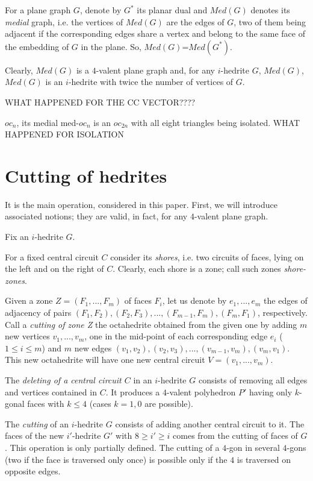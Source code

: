 \documentclass[12pt]{article}
\begin{document}
For a plane graph $G$, denote by $G^*$ its planar dual and {\em $Med(G)$} 
denotes its {\em medial} graph, i.e. the vertices of $Med(G)$ are the edges of 
$G$, two of them being adjacent if the corresponding edges share a vertex and 
belong to the same face of the embedding of $G$ in the plane. 
So, $Med(G)$=$Med(G^*)$.

Clearly, $Med(G)$ is a $4$-valent plane graph and, for any $i$-hedrite $G$, $Med(G)$, $Med(G)$ is an $i$-hedrite with twice the number of vertices of $G$.

WHAT HAPPENED FOR THE CC VECTOR????

$oc_n$, its medial
med-$oc_{n}$
is an $oc_{2n}$ with all eight triangles being isolated.
WHAT HAPPENED FOR ISOLATION







\section{Cutting of hedrites}


It is the main operation, considered in this paper. First, we will introduce 
associated notions; they are valid, in fact, for any $4$-valent plane graph. 


Fix an $i$-hedrite $G$. 

For a fixed central circuit $C$ consider its {\em shores}, i.e. two circuits
of faces, lying on the left and on the right of $C$. Clearly, each shore is a 
zone; call such zones {\em shore-zones}.





Given a zone $Z=(F_1,...,F_m)$ of faces $F_i$, let us denote by $e_1,...,e_m$
the edges of adjacency of pairs $(F_1,F_2),(F_2,F_3),...,(F_{m-1},F_m),(F_m,F_1)$, respectively. Call a {\em cutting of zone Z} the octahedrite obtained from
the given one by adding $m$ new vertices $v_1,...,v_m$, one in the mid-point of
each corresponding edge $e_i$ ($1 \le i \le m$) and $m$ new edges
$(v_1,v_2),(v_2,v_3),...,(v_{m-1},v_m),(v_m,v_1)$. This new octahedrite 
will have one new central circuit $V=(v_1,...,v_m)$.


The {\em deleting of a central circuit $C$} in an $i$-hedrite $G$ consists 
of removing all edges and vertices contained in $C$. It produces a 
$4$-valent polyhedron $P'$ having only $k$-gonal faces 
with $k \leq 4$ (cases $k=1,0$ are possible).


The {\em cutting} of an $i$-hedrite $G$ consists of adding another central 
circuit to it. The faces of the new $i'$-hedrite $G'$ with $8\geq i'\geq i$ 
comes from the cutting of faces of $G$. This operation is only partially
defined. The cutting of a $4$-gon in several $4$-gons (two if the face
is traversed only once) is possible only if the $4$ is traversed on opposite 
edges.
\end{document}
